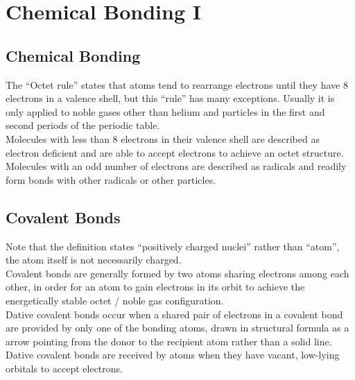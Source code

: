 \documentclass[../main]{subfiles}
\begin{document}
\section{Chemical Bonding I}

	\subsection{Chemical Bonding}


	The ``Octet rule'' states that atoms tend to rearrange electrons until they have 8 electrons in a valence shell, but this ``rule'' has many exceptions. Usually it is only applied to noble gases other than helium and particles in the first and second periods of the periodic table. \\

	Molecules with less than 8 electrons in their valence shell are described as electron deficient and are able to  accept electrons to achieve an octet structure. Molecules with an odd number of electrons are described as radicals and readily form bonds with other radicals or other particles.

	\subsection{Covalent Bonds}


	Note that the definition states ``positively charged nuclei'' rather than ``atom'', the atom itself is not necessarily charged. \\

	Covalent bonds are generally formed by two atoms sharing electrons among each other, in order for an atom to gain electrons in its orbit to achieve the energetically stable octet / noble gas configuration. \\

	Dative covalent bonds occur when a shared pair of electrons in a covalent bond are provided by only one of the bonding atoms, drawn in structural formula as a arrow pointing from the donor to the recipient atom rather than a solid line. Dative covalent bonds are received by atoms when they have vacant, low-lying orbitals to accept electrons.
\end{document}
